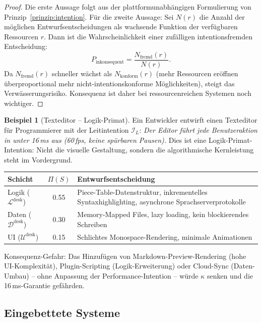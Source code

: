 ﻿\documentclass[a4paper,12pt]{article}
\theoremstyle{definition}
\newtheorem{beispiel}{Beispiel}
\begin{document}
\begin{proof}
Die erste Aussage folgt aus der plattformunabhängigen Formulierung von
Prinzip~\ref{prinzip:intention}. Für die zweite Aussage: Sei $N(r)$
die Anzahl der möglichen Entwurfsentscheidungen als wachsende Funktion
der verfügbaren Ressourcen $r$. Dann ist die Wahrscheinlichkeit einer
zufälligen intentionsfremden Entscheidung:
\[
P_{\text{inkonsequent}} = \frac{N_{\text{fremd}}(r)}{N(r)}.
\]
Da $N_{\text{fremd}}(r)$ schneller wächst als $N_{\text{konform}}(r)$
(mehr Ressourcen eröffnen überproportional mehr nicht-intentionskonforme
Möglichkeiten), steigt das Verwässerungsrisiko. Konsequenz ist daher
bei ressourcenreichen Systemen noch wichtiger.
\end{proof}

\begin{beispiel}[Texteditor -- Logik-Primat]\label{bsp:texteditor}
Ein Entwickler entwirft einen Texteditor für Programmierer mit der
Leitintention $\mathcal{I}_L$: \textit{\glqq{}Der Editor führt jede
Benutzeraktion in unter 16\,ms aus (60\,fps, keine spürbaren Pausen).\grqq{}}
Dies ist eine Logik-Primat-Intention: Nicht die visuelle Gestaltung,
sondern die algorithmische Kernleistung steht im Vordergrund.

\begin{center}
\begin{tabular}{lcp{5.5cm}}
\toprule
Schicht & $\Pi(S)$ & Entwurfsentscheidung \\
\midrule
Logik ($\mathcal{L}^{\text{desk}}$) & 0.55 & Piece-Table-Datenstruktur,
inkrementelles Syntaxhighlighting, asynchrone Sprachserverprotokolle \\
Daten ($\mathcal{D}^{\text{desk}}$) & 0.30 & Memory-Mapped Files, lazy
loading, kein blockierendes Schreiben \\
UI ($\mathcal{U}^{\text{desk}}$) & 0.15 & Schlichtes Monospace-Rendering,
minimale Animationen \\
\bottomrule
\end{tabular}
\end{center}

Konsequenz-Gefahr: Das Hinzufügen von Markdown-Preview-Rendering (hohe
UI-Komplexität), Plugin-Scripting (Logik-Erweiterung) oder Cloud-Sync
(Daten-Umbau) -- ohne Anpassung der Performance-Intention -- würde
$\kappa$ senken und die 16\,ms-Garantie gefährden.
\end{beispiel}

\subsection{Eingebettete Systeme}
\end{document}
